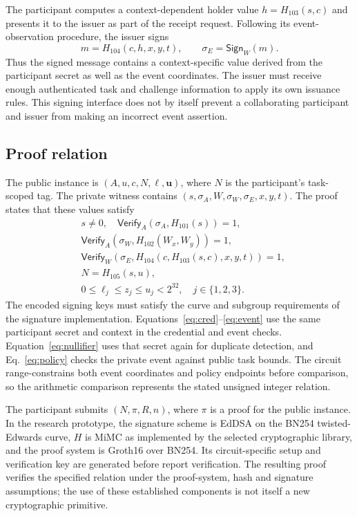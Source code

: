 The participant computes a context-dependent holder value $h=H_{103}(s,c)$ and presents it to the issuer as part of the receipt request. Following its event-observation procedure, the issuer signs
\begin{equation}
 m=H_{104}(c,h,x,y,t), \qquad \sigma_E=\mathsf{Sign}_{W}(m).
 \label{eq:receipt}
\end{equation}
Thus the signed message contains a context-specific value derived from the participant secret as well as the event coordinates. The issuer must receive enough authenticated task and challenge information to apply its own issuance rules. This signing interface does not by itself prevent a collaborating participant and issuer from making an incorrect event assertion.

\subsection{Proof relation}
\label{sec:relation}

The public instance is $(A,u,c,N,\boldsymbol{\ell},\boldsymbol u)$, where $N$ is the participant's task-scoped tag. The private witness contains $(s,\sigma_A,W,\sigma_W,\sigma_E,x,y,t)$. The proof states that these values satisfy
\begin{align}
 &s\ne 0, \quad \mathsf{Verify}_A(\sigma_A,H_{101}(s))=1,\label{eq:cred}\\
 &\mathsf{Verify}_A(\sigma_W,H_{102}(W_x,W_y))=1,\label{eq:issuer}\\
 &\mathsf{Verify}_W\!\left(\sigma_E,H_{104}(c,H_{103}(s,c),x,y,t)\right)=1,\label{eq:event}\\
 &N=H_{105}(s,u),\label{eq:nullifier}\\
 &0\leq \ell_j\leq z_j\leq u_j<2^{32},\quad j\in\{1,2,3\}.
 \label{eq:policy}
\end{align}
The encoded signing keys must satisfy the curve and subgroup requirements of the signature implementation. Equations~\eqref{eq:cred}--\eqref{eq:event} use the same participant secret and context in the credential and event checks. Equation~\eqref{eq:nullifier} uses that secret again for duplicate detection, and Eq.~\eqref{eq:policy} checks the private event against public task bounds. The circuit range-constrains both event coordinates and policy endpoints before comparison, so the arithmetic comparison represents the stated unsigned integer relation.

The participant submits $(N,\pi,R,n)$, where $\pi$ is a proof for the public instance. In the research prototype, the signature scheme is EdDSA on the BN254 twisted-Edwards curve, $H$ is MiMC as implemented by the selected cryptographic library, and the proof system is Groth16 over BN254. Its circuit-specific setup and verification key are generated before report verification. The resulting proof verifies the specified relation under the proof-system, hash and signature assumptions; the use of these established components is not itself a new cryptographic primitive.

